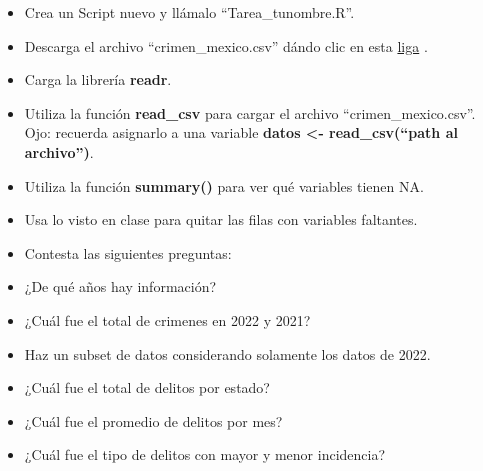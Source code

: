 \documentclass[
]{book}
\providecommand{\tightlist}{%
  \setlength{\itemsep}{0pt}\setlength{\parskip}{0pt}}
\begin{document}
\begin{itemize}
\tightlist
\item
  Crea un Script nuevo y llámalo ``Tarea\_tunombre.R''.
\item
  Descarga el archivo ``crimen\_mexico.csv'' dándo clic en esta \href{https://www.dropbox.com/s/nq3sg9gnvis3ezy/crimen_mexico.csv?dl=1}{liga} .\\
\item
  Carga la librería \textbf{readr}.
\item
  Utiliza la función \textbf{read\_csv} para cargar el archivo ``crimen\_mexico.csv''. Ojo: recuerda asignarlo a una variable \textbf{datos \textless- read\_csv(``path al archivo'')}.
\item
  Utiliza la función \textbf{summary()} para ver qué variables tienen NA.
\item
  Usa lo visto en clase para quitar las filas con variables faltantes.
\item
  Contesta las siguientes preguntas:
\item
  ¿De qué años hay información?
\item
  ¿Cuál fue el total de crimenes en 2022 y 2021?
\item
  Haz un subset de datos considerando solamente los datos de 2022.
\item
  ¿Cuál fue el total de delitos por estado?
\item
  ¿Cuál fue el promedio de delitos por mes?
\item
  ¿Cuál fue el tipo de delitos con mayor y menor incidencia?
\end{itemize}

  
\end{document}
